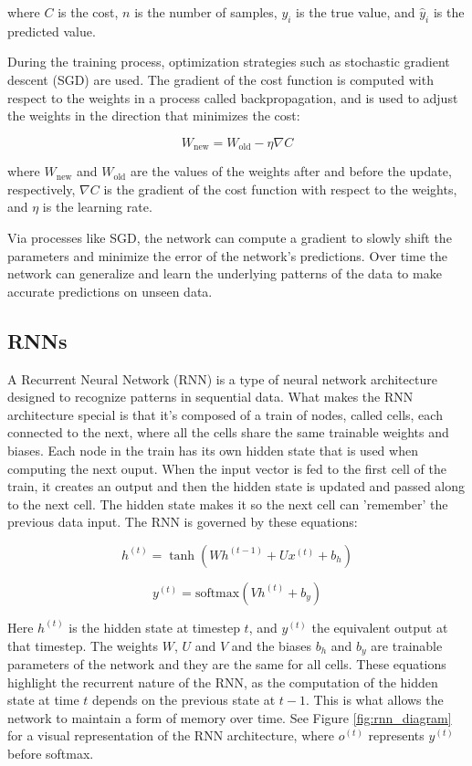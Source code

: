 \documentclass[11pt]{article}
\begin{document}
where \(C\) is the cost, \(n\) is the number of samples, \(y_i\) is the true value, and \(\hat{y}_i\) is the predicted value.

During the training process, optimization strategies such as stochastic gradient descent (SGD) are used. The gradient of the cost function is computed with respect to the weights in a process called backpropagation, and is used to adjust the weights in the direction that minimizes the cost:

\[ W_{\text{new}} = W_{\text{old}} - \eta \nabla C \]

where \(W_{\text{new}}\) and \(W_{\text{old}}\) are the values of the weights after and before the update, respectively, \(\nabla C\) is the gradient of the cost function with respect to the weights, and \(\eta\) is the learning rate.

Via processes like SGD, the network can compute a gradient to slowly shift the parameters and minimize the error of the network's predictions. Over time the network can generalize and learn the underlying patterns of the data to make accurate predictions on unseen data.

\subsection{RNNs}
A Recurrent Neural Network (RNN) is a type of neural network architecture designed to recognize patterns in sequential data. What makes the RNN architecture special is that it's composed of a train of nodes, called cells, each connected to the next, where all the cells share the same trainable weights and biases. Each node in the train has its own hidden state that is used when computing the next ouput. When the input vector is fed to the first cell of the train, it creates an output and then the hidden state is updated and passed along to the next cell. The hidden state makes it so the next cell can 'remember' the previous data input. The RNN is governed by these equations:

\begin{equation}
h^{(t)} = \tanh(Wh^{(t-1)} + Ux^{(t)} + b_h)
\end{equation}

\begin{equation}
y^{(t)} = \text{softmax}(Vh^{(t)} + b_y)
\end{equation}

Here \(h^{(t)}\) is the hidden state at timestep $t$, and \(y^{(t)}\) the equivalent output at that timestep. The weights $W$, $U$ and $V$ and the biases $b_h$ and $b_y$ are trainable parameters of the network and they are the same for all cells. These equations highlight the recurrent nature of the RNN, as the computation of the hidden state at time $t$ depends on the previous state at $t-1$. This is what allows the network to maintain a form of memory over time. See Figure \ref{fig:rnn_diagram} for a visual representation of the RNN architecture, where $o^{(t)}$ represents $y^{(t)}$ before softmax.
\end{document}
